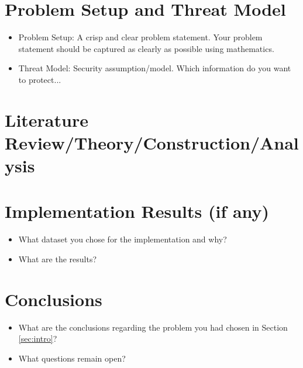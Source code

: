 \documentclass[10pt]{article}
\begin{document}
\section{Problem Setup and Threat Model}
\begin{itemize}
 \item Problem Setup: A crisp and clear problem statement. Your problem statement should be captured as clearly as possible using mathematics. 
 \item Threat Model: Security assumption/model. Which information do you want to protect...
\end{itemize}
 


\section{Literature Review/Theory/Construction/Analysis}


\section{Implementation Results (if any)}
\begin{itemize}
\item What dataset you chose for the implementation and why? 
\item What are the results?
\end{itemize}



\section{Conclusions}
\begin{itemize}
\item What are the conclusions regarding the problem you had chosen in Section \ref{sec:intro}? 
\item What questions remain open? 
\end{itemize}





\end{document}
